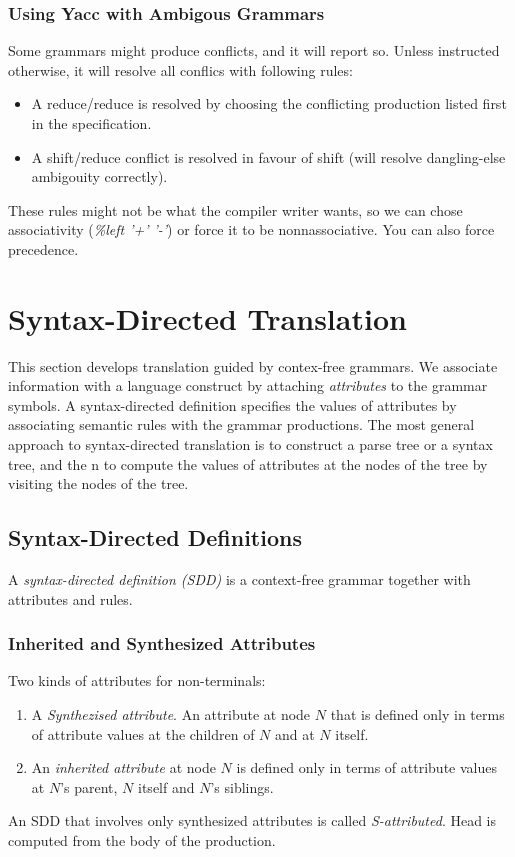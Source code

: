 \documentclass{article}
\begin{document}
\subsubsection{Using Yacc with Ambigous Grammars} %
\label{ssub:Using Yacc with Ambigous Grammars}
Some grammars might produce conflicts, and it will report so. Unless instructed otherwise, it will resolve all conflics with following rules:
\begin{itemize}
	\item A reduce/reduce is resolved by choosing the conflicting production listed first in the specification.
	\item A shift/reduce conflict is resolved in favour of shift (will resolve dangling-else ambigouity correctly).
\end{itemize}
These rules might not be what the compiler writer wants, so we can chose associativity (\emph{\%left '+' '-'}) or force it to be nonnassociative. You can also force precedence.

\section{Syntax-Directed Translation} %
\label{sec:Syntax-Directed Translation}
This section develops translation guided by contex-free grammars. We associate information with a language construct by attaching \emph{attributes} to the grammar symbols. A syntax-directed definition specifies the values of attributes by associating semantic rules with the grammar productions. The most general approach to syntax-directed translation is to construct a parse tree or a syntax tree, and the n to compute the values of attributes at the nodes of the tree by visiting the nodes of the tree.

\subsection{Syntax-Directed Definitions} %
\label{sub:Syntax-Directed Definitions}
A \emph{syntax-directed definition (SDD)} is a context-free grammar together with attributes and rules.

\subsubsection{Inherited and Synthesized Attributes} %
\label{ssub:Inherited and Synthesized Attributes}
Two kinds of attributes for non-terminals:
\begin{enumerate}
	\item A \emph{Synthezised attribute}. An attribute at node $N$ that is defined only in terms of attribute values at the children of $N$ and at $N$ itself.
	\item An \emph{inherited attribute} at node $N$ is defined only in terms of attribute values at $N$'s parent, $N$ itself and $N$'s siblings.
\end{enumerate}
An SDD that involves only synthesized attributes is called \emph{S-attributed}. Head is computed from the body of the production.
\end{document}
